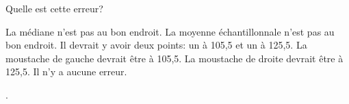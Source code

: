 \begin{questions}
Quelle est cette erreur?

  \begin{checkboxes}
\choice La médiane n'est pas au bon endroit.  %
\choice La moyenne échantillonnale n'est pas au bon endroit. %
\choice Il devrait y avoir deux points: un à 105,5 et un à 125,5.
\choice La moustache de gauche devrait être à  105,5. 
\choice La moustache de droite devrait être à 125,5.
\choice Il n'y a aucune erreur.
\end{checkboxes}

\vspace{1cm}
\newpage
.
\end{questions}


 
